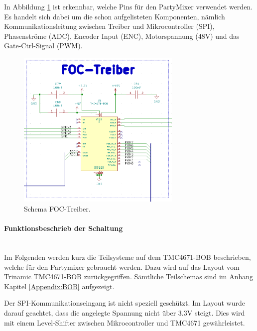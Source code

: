 In Abbildung \ref{fig:Schema_FOC_Treiber} ist erkennbar, welche Pins für den PartyMixer verwendet werden. Es handelt sich dabei um die schon aufgelisteten Komponenten, nämlich Kommunikationsleitung zwischen Treiber und Mikrocontroller (SPI), Phasenströme (ADC), Encoder Input (ENC), Motorspannung (48V) und das Gate-Ctrl-Signal (PWM).

\begin{figure}[H]
	\centering
	\includegraphics[width=0.7\textwidth]{graphics/Schema_FOC_Treiber}
	\caption{Schema FOC-Treiber.}
	\label{fig:Schema_FOC_Treiber}
\end{figure} 

\paragraph{Funktionsbeschrieb der Schaltung}\mbox{}\\

Im Folgenden werden kurz die Teilsysteme auf dem TMC4671-BOB beschrieben, welche für den Partymixer gebraucht werden. Dazu wird auf das Layout vom Trinamic TMC4671-BOB zurückgegriffen. Sämtliche Teilschemas sind im Anhang Kapitel \ref{Appendix:BOB} aufgezeigt. \cite{trinamicmotion_control_gmbh__co_kg_tmc4671-bob_2020}


Der SPI-Kommunikationseingang ist nicht speziell geschützt. Im Layout wurde darauf geachtet, dass die angelegte Spannung nicht über 3.3V steigt. Dies wird mit einem Level-Shifter zwischen Mikrocontroller und TMC4671 gewährleistet.


